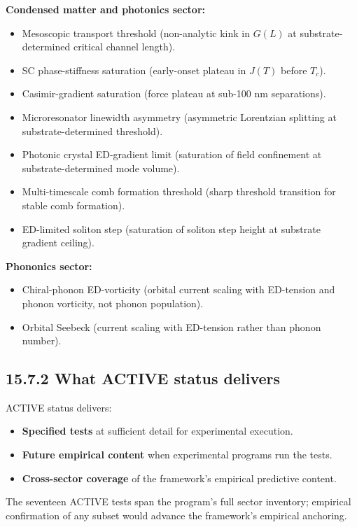 \documentclass[11pt]{book}
\begin{document}
\textbf{Condensed matter and photonics sector:}
\begin{itemize}
\item Mesoscopic transport threshold (non-analytic kink in $G(L)$ at substrate-determined critical channel length).
\item SC phase-stiffness saturation (early-onset plateau in $J(T)$ before $T_c$).
\item Casimir-gradient saturation (force plateau at sub-100 nm separations).
\item Microresonator linewidth asymmetry (asymmetric Lorentzian splitting at substrate-determined threshold).
\item Photonic crystal ED-gradient limit (saturation of field confinement at substrate-determined mode volume).
\item Multi-timescale comb formation threshold (sharp threshold transition for stable comb formation).
\item ED-limited soliton step (saturation of soliton step height at substrate gradient ceiling).
\end{itemize}

\textbf{Phononics sector:}
\begin{itemize}
\item Chiral-phonon ED-vorticity (orbital current scaling with ED-tension and phonon vorticity, not phonon population).
\item Orbital Seebeck (current scaling with ED-tension rather than phonon number).
\end{itemize}

\subsection{15.7.2 What ACTIVE status delivers}

ACTIVE status delivers:
\begin{itemize}
\item \textbf{Specified tests} at sufficient detail for experimental execution.
\item \textbf{Future empirical content} when experimental programs run the tests.
\item \textbf{Cross-sector coverage} of the framework's empirical predictive content.
\end{itemize}

The seventeen ACTIVE tests span the program's full sector inventory; empirical confirmation of any subset would advance the framework's empirical anchoring.
\end{document}
